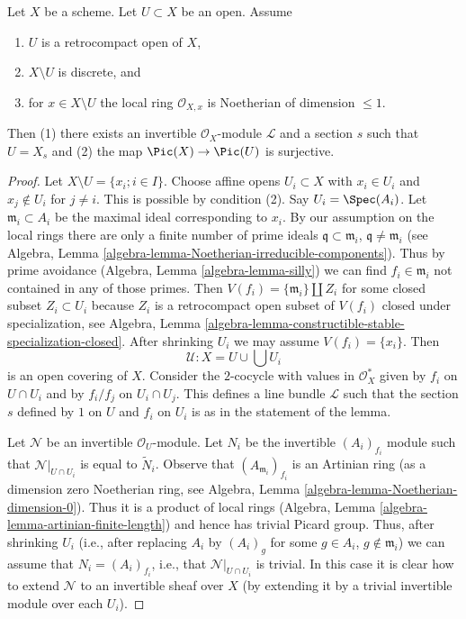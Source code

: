 \begin{lemma}
\label{lemma-complement-codim-1-closed-points}
Let $X$ be a scheme. Let $U \subset X$ be an open. Assume
\begin{enumerate}
\item $U$ is a retrocompact open of $X$,
\item $X \setminus U$ is discrete, and
\item for $x \in X \setminus U$ the local ring
$\mathcal{O}_{X, x}$ is Noetherian of dimension $\leq 1$.
\end{enumerate}
Then (1) there exists an invertible $\mathcal{O}_X$-module $\mathcal{L}$
and a section $s$ such that $U = X_s$ and (2) the map
$\Pic(X) \to \Pic(U)$ is surjective.
\end{lemma}

\begin{proof}
Let $X \setminus U = \{x_i; i \in I\}$.
Choose affine opens $U_i \subset X$ with $x_i \in U_i$ and
$x_j \not \in U_i$ for $j \not = i$. This is possible by condition (2).
Say $U_i = \Spec(A_i)$. Let $\mathfrak m_i \subset A_i$ be the maximal
ideal corresponding to $x_i$. By our assumption on the local rings
there are only a finite number of prime ideals
$\mathfrak q \subset \mathfrak m_i$,
$\mathfrak q \not = \mathfrak m_i$ (see
Algebra, Lemma \ref{algebra-lemma-Noetherian-irreducible-components}).
Thus by prime avoidance (Algebra, Lemma
\ref{algebra-lemma-silly}) we can find $f_i \in \mathfrak m_i$
not contained in any of those primes. Then
$V(f_i) = \{\mathfrak m_i\} \amalg Z_i$ for some closed subset
$Z_i \subset U_i$ because $Z_i$ is a retrocompact open subset of
$V(f_i)$ closed under specialization, see
Algebra, Lemma \ref{algebra-lemma-constructible-stable-specialization-closed}.
After shrinking $U_i$ we may assume $V(f_i) = \{x_i\}$. Then
$$
\mathcal{U} : X = U \cup \bigcup U_i
$$
is an open covering of $X$. Consider the $2$-cocycle with values
in $\mathcal{O}_X^*$ given by $f_i$ on $U \cap U_i$ and by
$f_i/f_j$ on $U_i \cap U_j$. This defines a line bundle
$\mathcal{L}$ such that the section $s$ defined by $1$ on $U$
and $f_i$ on $U_i$ is as in the statement of the lemma.

\medskip\noindent
Let $\mathcal{N}$ be an invertible $\mathcal{O}_U$-module.
Let $N_i$ be the invertible $(A_i)_{f_i}$ module such that
$\mathcal{N}|_{U \cap U_i}$ is equal to $\tilde N_i$.
Observe that $(A_{\mathfrak m_i})_{f_i}$ is an Artinian ring
(as a dimension zero Noetherian ring, see
Algebra, Lemma \ref{algebra-lemma-Noetherian-dimension-0}).
Thus it is a product of local rings
(Algebra, Lemma \ref{algebra-lemma-artinian-finite-length}) and
hence has trivial Picard group. Thus, after shrinking $U_i$
(i.e., after replacing $A_i$ by $(A_i)_g$ for some $g \in A_i$,
$g \not \in \mathfrak m_i$)
we can assume that $N_i = (A_i)_{f_i}$, i.e., that
$\mathcal{N}|_{U \cap U_i}$ is trivial. In this case it is
clear how to extend $\mathcal{N}$ to an invertible sheaf over $X$
(by extending it by a trivial invertible module over each $U_i$).
\end{proof}

